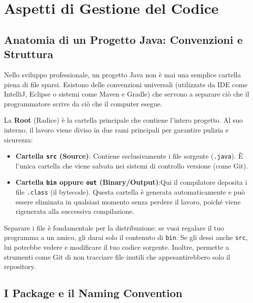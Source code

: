 \chapter{Aspetti di Gestione del Codice}

\section{Anatomia di un Progetto Java: Convenzioni e Struttura}

Nello sviluppo professionale, un progetto Java non è mai una semplice cartella piena di file sparsi. Esistono delle convenzioni universali (utilizzate da IDE come IntelliJ, Eclipse o sistemi come Maven e Gradle) che servono a separare ciò che il programmatore scrive da ciò che il computer esegue.

La \textbf{Root} (Radice) è la cartella principale che contiene l'intero progetto. Al suo interno, il lavoro viene diviso in due rami principali per garantire pulizia e sicurezza:

\begin{itemize}
    \item \textbf{Cartella \texttt{src} (Source)}: Contiene esclusivamente i file sorgente (\texttt{.java}). È l'unica cartella che viene salvata nei sistemi di controllo versione (come Git).
    \item \textbf{Cartella \texttt{bin} oppure \texttt{out} (Binary/Output)}:Qui il compilatore deposita i file \texttt{.class} (il bytecode). Questa cartella è generata automaticamente e può essere eliminata in qualsiasi momento senza perdere il lavoro, poiché viene rigenerata alla successiva compilazione.
\end{itemize}


\begin{observation}
    Separare i file è fondamentale per la distribuzione: se vuoi regalare il tuo programma a un amico, gli darai solo il contenuto di \texttt{bin}. Se gli dessi anche \texttt{src}, lui potrebbe vedere e modificare il tuo codice sorgente. Inoltre, permette a strumenti come Git di non tracciare file inutili che appesantirebbero solo il repository.
\end{observation}


\section{I Package e il Naming Convention}

